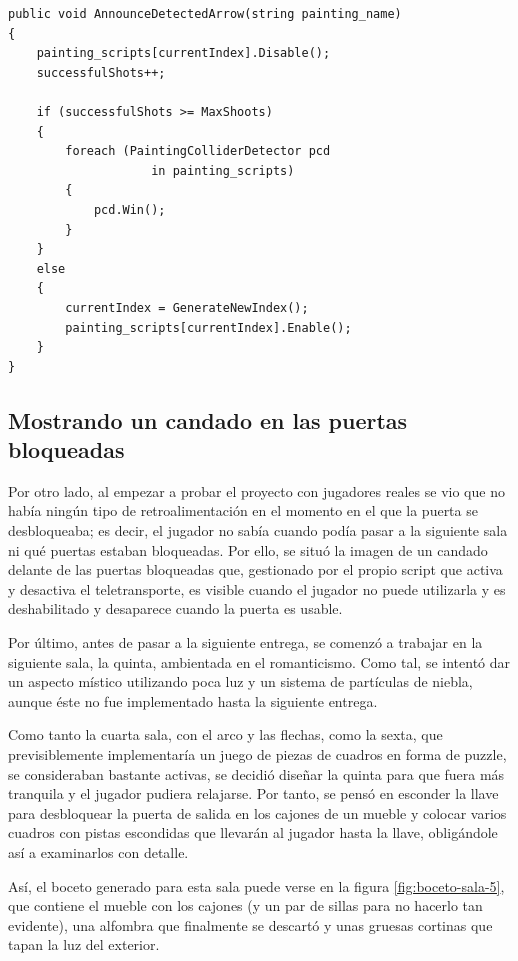 \begin{lstlisting}[caption=Fragmento del script para gestionar el juego del arco, label=lst:painting-manager]
public void AnnounceDetectedArrow(string painting_name)
{
    painting_scripts[currentIndex].Disable();
    successfulShots++;

    if (successfulShots >= MaxShoots)
    {
        foreach (PaintingColliderDetector pcd
                    in painting_scripts)
        {
            pcd.Win();
        }
    }
    else
    {
        currentIndex = GenerateNewIndex();
        painting_scripts[currentIndex].Enable();
    }
}
\end{lstlisting}

\subsection{Mostrando un candado en las puertas bloqueadas}

Por otro lado, al empezar a probar el proyecto con jugadores reales se vio que no había ningún tipo de retroalimentación en el momento en el que la puerta se desbloqueaba; es decir, el jugador no sabía cuando podía pasar a la siguiente sala ni qué puertas estaban bloqueadas. Por ello, se situó la imagen de un candado delante de las puertas bloqueadas que, gestionado por el propio script que activa y desactiva el teletransporte, es visible cuando el jugador no puede utilizarla y es deshabilitado y desaparece cuando la puerta es usable.

Por último, antes de pasar a la siguiente entrega, se comenzó a trabajar en la siguiente sala, la quinta, ambientada en el romanticismo. Como tal, se intentó dar un aspecto místico utilizando poca luz y un sistema de partículas de niebla, aunque éste no fue implementado hasta la siguiente entrega.

Como tanto la cuarta sala, con el arco y las flechas, como la sexta, que previsiblemente implementaría un juego de piezas de cuadros en forma de puzzle, se consideraban bastante activas, se decidió diseñar la quinta para que fuera más tranquila y el jugador pudiera relajarse. Por tanto, se pensó en esconder la llave para desbloquear la puerta de salida en los cajones de un mueble y colocar varios cuadros con pistas escondidas que llevarán al jugador hasta la llave, obligándole así a examinarlos con detalle.

Así, el boceto generado para esta sala puede verse en la figura \ref{fig:boceto-sala-5}, que contiene el mueble con los cajones (y un par de sillas para no hacerlo tan evidente), una alfombra que finalmente se descartó y unas gruesas cortinas que tapan la luz del exterior.

